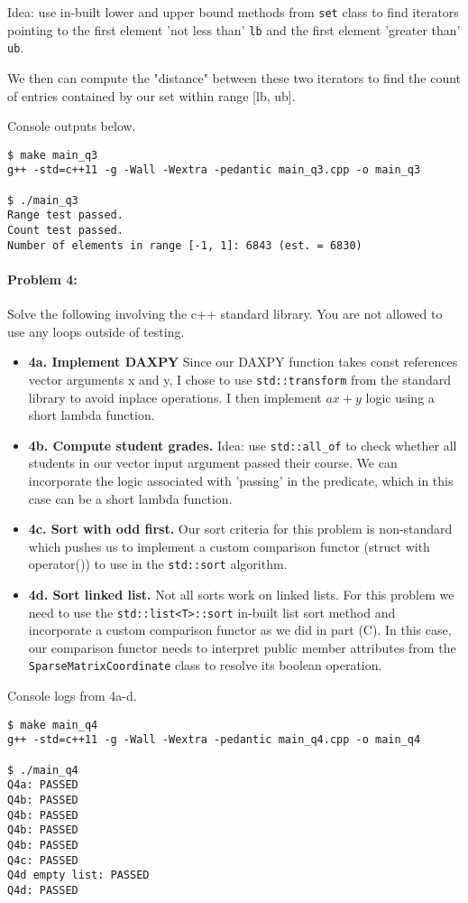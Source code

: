 \documentclass[12pt,letterpaper,twoside]{article}
\begin{document}
Idea: use in-built lower and upper bound methods from \texttt{set}
class to find iterators pointing to the first element 'not less than'
\texttt{lb} and the first element 'greater than' \texttt{ub}. 

We then can compute the "distance" between these two iterators to
find the count of entries contained by our set within range [lb, ub].

Console outputs below.
\begin{verbatim}
$ make main_q3
g++ -std=c++11 -g -Wall -Wextra -pedantic main_q3.cpp -o main_q3

$ ./main_q3
Range test passed.
Count test passed.
Number of elements in range [-1, 1]: 6843 (est. = 6830)
\end{verbatim}


\paragraph{Problem 4: } Solve the following involving the c++ standard
library. You are not allowed to use any loops outside of testing.

\begin{itemize}
    \item \textbf{4a. Implement DAXPY} Since our DAXPY function takes
    const references vector arguments x and y, I chose to use 
    \texttt{std::transform} from the standard library to avoid
    inplace operations. I then implement $ax + y$ logic using a 
    short lambda function.

    \item \textbf{4b. Compute student grades.} Idea: use \texttt{std::all\_of}
    to check whether all students in our vector input argument passed
    their course. We can incorporate the logic associated with 'passing'
    in the predicate, which in this case can be a short lambda function.

    \item \textbf{4c. Sort with odd first.} Our sort criteria for this problem 
    is non-standard which pushes us to implement a custom comparison 
    functor (struct with operator()) to use in the \texttt{std::sort}
    algorithm.

    \item \textbf{4d. Sort linked list.} Not all sorts work on linked lists.
    For this problem we need to use the \texttt{std::list<T>::sort} in-built
    list sort method and incorporate a custom comparison functor as we did
    in part (C). In this case, our comparison functor needs to interpret 
    public member attributes from the \texttt{SparseMatrixCoordinate} 
    class to resolve its boolean operation.

\end{itemize}

Console logs from 4a-d.
\begin{verbatim}
$ make main_q4
g++ -std=c++11 -g -Wall -Wextra -pedantic main_q4.cpp -o main_q4

$ ./main_q4
Q4a: PASSED
Q4b: PASSED
Q4b: PASSED
Q4b: PASSED
Q4b: PASSED
Q4c: PASSED
Q4d empty list: PASSED
Q4d: PASSED
\end{verbatim}
\end{document}
